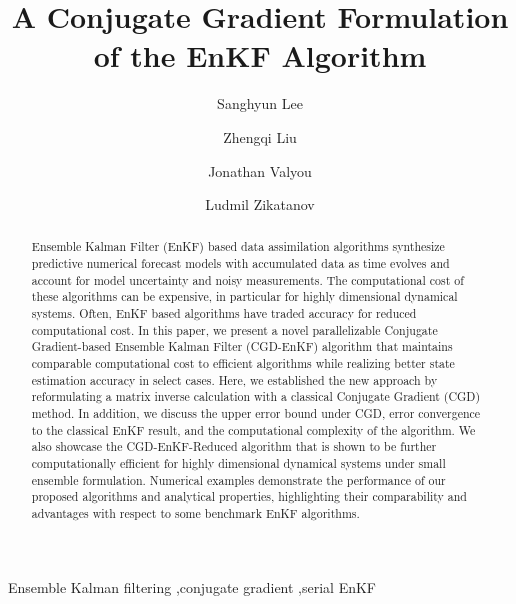 \documentclass[11p]{elsarticle}
\numberwithin{equation}{section}
\begin{document}
\begin{frontmatter}

\title{{A Conjugate Gradient Formulation of the EnKF Algorithm}}




\author[fsu]{Sanghyun Lee}
\author[penn]{Zhengqi Liu}
\author[fsu]{Jonathan Valyou}
\author[penn]{Ludmil Zikatanov}




\begin{abstract}
Ensemble Kalman Filter (EnKF) based data assimilation algorithms synthesize predictive numerical forecast models with accumulated data as time evolves and account for model uncertainty and noisy measurements.  The computational cost of these algorithms can be expensive, in particular for highly dimensional dynamical systems.  Often, EnKF based algorithms have traded accuracy for reduced computational cost.  In this paper, we present a novel parallelizable Conjugate Gradient-based Ensemble Kalman Filter (CGD-EnKF) algorithm that maintains comparable computational cost to efficient algorithms while realizing better state estimation accuracy in select cases.  Here, we established the new approach by reformulating a matrix inverse calculation with a classical Conjugate Gradient (CGD) method.  In addition, we discuss the upper error bound under CGD, error convergence to the classical EnKF result, and the computational complexity of the algorithm.  We also showcase the CGD-EnKF-Reduced algorithm that is shown to be further computationally efficient for highly dimensional dynamical systems under small ensemble formulation.  Numerical examples demonstrate the performance of our proposed algorithms and analytical properties, highlighting their comparability and advantages with respect to some benchmark EnKF algorithms.

\end{abstract}

\begin{keyword}
Ensemble Kalman filtering \sep conjugate gradient \sep serial EnKF
\end{keyword}

\end{frontmatter}
\end{document}
